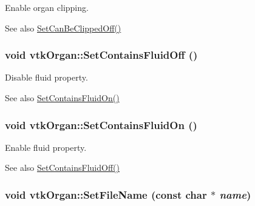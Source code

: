 Enable organ clipping. \begin{DoxySeeAlso}{See also}
\hyperlink{classvtkOrgan_a6faee69d6495879b5f545bf1446dd304}{SetCanBeClippedOff()} 
\end{DoxySeeAlso}
\hypertarget{classvtkOrgan_a387870655644666d7e337071ebca3708}{
\subsubsection[{SetContainsFluidOff}]{\setlength{\rightskip}{0pt plus 5cm}void vtkOrgan::SetContainsFluidOff ()}}
\label{classvtkOrgan_a387870655644666d7e337071ebca3708}


Disable fluid property. \begin{DoxySeeAlso}{See also}
\hyperlink{classvtkOrgan_a776239497bc5ca06cdea73d5dd572000}{SetContainsFluidOn()} 
\end{DoxySeeAlso}
\hypertarget{classvtkOrgan_a776239497bc5ca06cdea73d5dd572000}{
\subsubsection[{SetContainsFluidOn}]{\setlength{\rightskip}{0pt plus 5cm}void vtkOrgan::SetContainsFluidOn ()}}
\label{classvtkOrgan_a776239497bc5ca06cdea73d5dd572000}


Enable fluid property. \begin{DoxySeeAlso}{See also}
\hyperlink{classvtkOrgan_a387870655644666d7e337071ebca3708}{SetContainsFluidOff()} 
\end{DoxySeeAlso}
\hypertarget{classvtkOrgan_a9fad20fc19aadd62505ed6a39e482d23}{
\subsubsection[{SetFileName}]{\setlength{\rightskip}{0pt plus 5cm}void vtkOrgan::SetFileName (const char $\ast$ {\em name})}}
\label{classvtkOrgan_a9fad20fc19aadd62505ed6a39e482d23}


